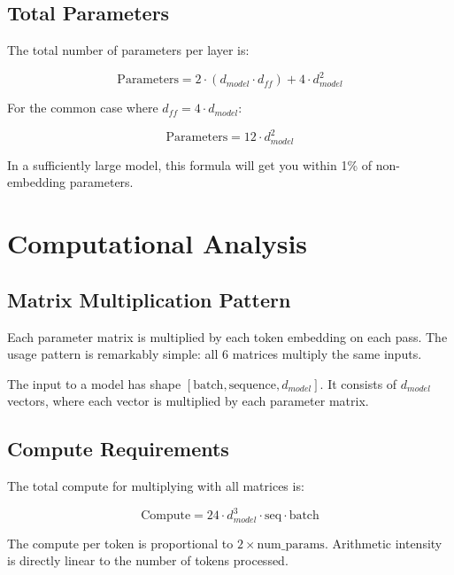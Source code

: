 \documentclass[11pt,a4paper]{article}
\begin{document}
\subsection{Total Parameters}

The total number of parameters per layer is:

\begin{equation}
\text{Parameters} = 2 \cdot (d_{model} \cdot d_{ff}) + 4 \cdot d_{model}^2
\end{equation}

For the common case where $d_{ff} = 4 \cdot d_{model}$:

\begin{equation}
\text{Parameters} = 12 \cdot d_{model}^2
\end{equation}

In a sufficiently large model, this formula will get you within 1\% of non-embedding parameters.

\section{Computational Analysis}

\subsection{Matrix Multiplication Pattern}

Each parameter matrix is multiplied by each token embedding on each pass. The usage pattern is remarkably simple: all 6 matrices multiply the same inputs.

The input to a model has shape $[\text{batch}, \text{sequence}, d_{model}]$. It consists of $d_{model}$ vectors, where each vector is multiplied by each parameter matrix.

\subsection{Compute Requirements}

The total compute for multiplying with all matrices is:

\begin{equation}
\text{Compute} = 24 \cdot d_{model}^3 \cdot \text{seq} \cdot \text{batch}
\end{equation}

The compute per token is proportional to $2 \times \text{num\_params}$. Arithmetic intensity is directly linear to the number of tokens processed.
\end{document}
